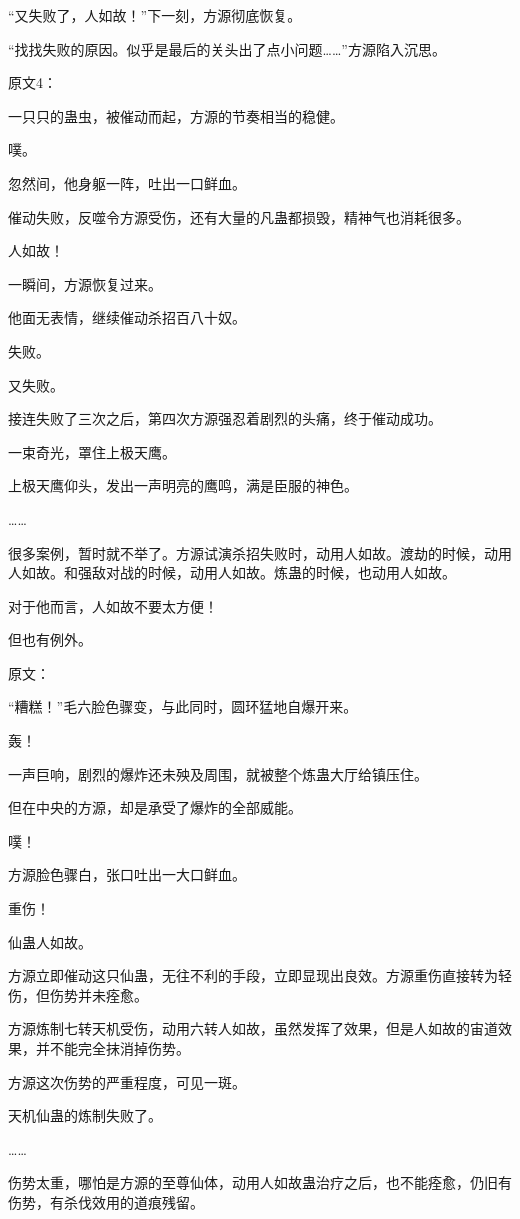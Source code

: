 \begin{this_body}
“又失败了，人如故！”下一刻，方源彻底恢复。

“找找失败的原因。似乎是最后的关头出了点小问题……”方源陷入沉思。

原文4：

一只只的蛊虫，被催动而起，方源的节奏相当的稳健。

噗。

忽然间，他身躯一阵，吐出一口鲜血。

催动失败，反噬令方源受伤，还有大量的凡蛊都损毁，精神气也消耗很多。

人如故！

一瞬间，方源恢复过来。

他面无表情，继续催动杀招百八十奴。

失败。

又失败。

接连失败了三次之后，第四次方源强忍着剧烈的头痛，终于催动成功。

一束奇光，罩住上极天鹰。

上极天鹰仰头，发出一声明亮的鹰鸣，满是臣服的神色。

……

很多案例，暂时就不举了。方源试演杀招失败时，动用人如故。渡劫的时候，动用人如故。和强敌对战的时候，动用人如故。炼蛊的时候，也动用人如故。

对于他而言，人如故不要太方便！

但也有例外。

原文：

“糟糕！”毛六脸色骤变，与此同时，圆环猛地自爆开来。

轰！

一声巨响，剧烈的爆炸还未殃及周围，就被整个炼蛊大厅给镇压住。

但在中央的方源，却是承受了爆炸的全部威能。

噗！

方源脸色骤白，张口吐出一大口鲜血。

重伤！

仙蛊人如故。

方源立即催动这只仙蛊，无往不利的手段，立即显现出良效。方源重伤直接转为轻伤，但伤势并未痊愈。

方源炼制七转天机受伤，动用六转人如故，虽然发挥了效果，但是人如故的宙道效果，并不能完全抹消掉伤势。

方源这次伤势的严重程度，可见一斑。

天机仙蛊的炼制失败了。

……

伤势太重，哪怕是方源的至尊仙体，动用人如故蛊治疗之后，也不能痊愈，仍旧有伤势，有杀伐效用的道痕残留。


\end{this_body}
